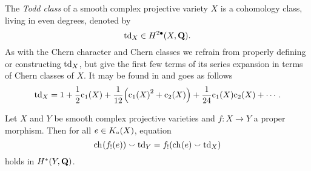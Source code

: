 The \emph{Todd class} of a smooth complex projective variety $X$ is a cohomology class, living in even degrees, denoted by
\[
    \operatorname{td}_{X} \in H^{2\bullet}(X, \mathbf Q).
\]
As with the Chern character and Chern classes we refrain from properly defining or constructing $\operatorname{td}_{X}$, but give the first few terms of its series expansion in terms of Chern classes of 
$X$. It may be found in \cite[\S 3, Example 3.2.4]{Fulton1998} and goes as follows
\begin{equation}
    \label{eq: todd class}
    \tdclass{X} = 1 + \frac{1}{2}\cclass[1](X) + \frac{1}{12}\Bigl(\cclass[1]{X}^2 + \cclass[2]{X}\Bigr) + \frac{1}{24}\cclass[1](X)\cclass[2](X) + \cdots.
\end{equation} 





\begin{theorem}
    \label{Grothendieck-Riemann-Roch}
    Let $X$ and $Y$ be smooth complex projective varieties and ${f \colon X \to Y}$ a proper morphism. Then for all $e \in K_{\circ}(X)$, equation 
    \begin{equation}
        \label{eq: GRR}
        \ch[]{f_!(e)} \smallsmile \tdclass{Y} = f_!(\ch[]{e} \smallsmile \tdclass{X})
    \end{equation}
    holds in $H^{*}(Y, \mathbf Q)$.
\end{theorem}

